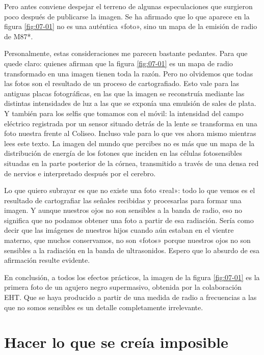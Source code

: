 Pero antes conviene despejar el terreno de algunas especulaciones que surgieron poco después de publicarse la imagen. Se ha afirmado que lo que aparece en la figura \ref{fig:07-01} no es una auténtica «foto», sino un mapa de la emisión de radio de M87*.

Personalmente, estas consideraciones me parecen bastante pedantes. Para que quede claro: quienes afirman que la figura \ref{fig:07-01} es un mapa de radio transformado en una imagen tienen toda la razón. Pero no olvidemos que todas las fotos son el resultado de un proceso de cartografiado. Esto vale para las antiguas placas fotográficas, en las que la imagen se reconstruía mediante las distintas intensidades de luz a las que se exponía una emulsión de sales de plata. Y también para los selfis que tomamos con el móvil: la intensidad del campo eléctrico registrada por un sensor situado detrás de la lente se transforma en una foto nuestra frente al Coliseo. Incluso vale para lo que ves ahora mismo mientras lees este texto. La imagen del mundo que percibes no es más que un mapa de la distribución de energía de los fotones que inciden en las células fotosensibles situadas en la parte posterior de la córnea, transmitido a través de una densa red de nervios e interpretado después por el cerebro.

Lo que quiero subrayar es que no existe una foto «real»: todo lo que vemos es el resultado de cartografiar las señales recibidas y procesarlas para formar una imagen. Y aunque nuestros ojos no son sensibles a la banda de radio, eso no significa que no podamos obtener una foto a partir de esa radiación. Sería como decir que las imágenes de nuestros hijos cuando aún estaban en el vientre materno, que muchos conservamos, no son «fotos» porque nuestros ojos no son sensibles a la radiación en la banda de ultrasonidos. Espero que lo absurdo de esa afirmación resulte evidente.

En conclusión, a todos los efectos prácticos, la imagen de la figura \ref{fig:07-01} es la primera foto de un agujero negro supermasivo, obtenida por la colaboración EHT. Que se haya producido a partir de una medida de radio a frecuencias a las que no somos sensibles es un detalle completamente irrelevante.

\section{Hacer lo que se creía imposible}\label{sec:07-impossible}

